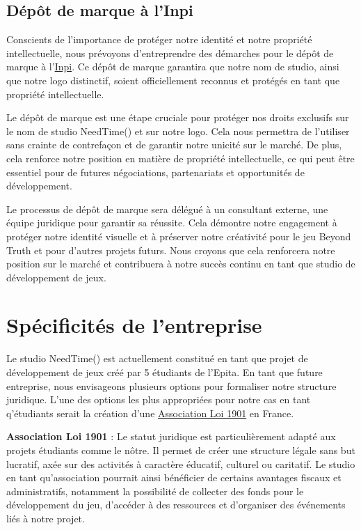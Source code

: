 \documentclass[
	article,			%
	11pt,				%
	oneside,			%
	a4paper,			%
	chapter=TITLE,
	french,			%
	sumario=tradicional
	]{base_nt}
\begin{document}
\subsection{Dépôt de marque à l'Inpi}

Conscients de l'importance de protéger notre identité et notre propriété intellectuelle, nous prévoyons d'entreprendre des démarches pour le dépôt de marque à l'\href{https://fr.wikipedia.org/wiki/Institut_national_de_la_propri%C3%A9t%C3%A9_industrielle}{Inpi}. Ce dépôt de marque garantira que notre nom de studio, ainsi que notre logo distinctif, soient officiellement reconnus et protégés en tant que propriété intellectuelle.

Le dépôt de marque est une étape cruciale pour protéger nos droits exclusifs sur le nom de studio NeedTime() et sur notre logo. Cela nous permettra de l'utiliser sans crainte de contrefaçon et de garantir notre unicité sur le marché. De plus, cela renforce notre position en matière de propriété intellectuelle, ce qui peut être essentiel pour de futures négociations, partenariats et opportunités de développement.

Le processus de dépôt de marque sera délégué à un consultant externe, une équipe juridique pour garantir sa réussite. Cela démontre notre engagement à protéger notre identité visuelle et à préserver notre créativité pour le jeu Beyond Truth et pour d'autres projets futurs. Nous croyons que cela renforcera notre position sur le marché et contribuera à notre succès continu en tant que studio de développement de jeux.

\section{Spécificités de l'entreprise}

Le studio NeedTime() est actuellement constitué en tant que projet de développement de jeux créé par 5 étudiants de l'Epita. En tant que future entreprise, nous envisageons plusieurs options pour formaliser notre structure juridique. L'une des options les plus appropriées pour notre cas en tant q'étudiants serait la création d'une \href{https://fr.wikipedia.org/wiki/Association_loi_de_1901}{Association Loi 1901} en France.

\textbf{Association Loi 1901} : Le statut juridique est particulièrement adapté aux projets étudiants comme le nôtre. Il permet de créer une structure légale sans but lucratif, axée sur des activités à caractère éducatif, culturel ou caritatif. Le studio en tant qu'association pourrait ainsi bénéficier de certains avantages fiscaux et administratifs, notamment la possibilité de collecter des fonds pour le développement du jeu, d'accéder à des ressources et d'organiser des événements liés à notre projet.
\end{document}
